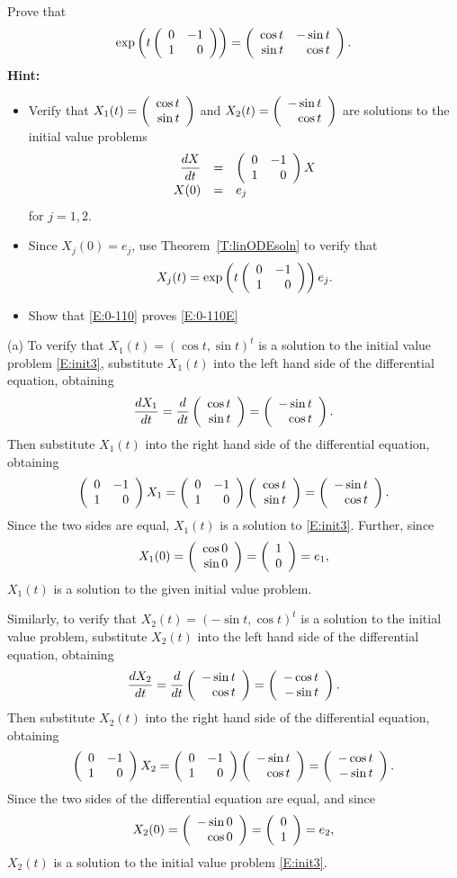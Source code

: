 \documentclass{ximera}
\begin{document}
\begin{computerExercise}  \label{c6.2.5C}
Prove that
\begin{equation}  \label{E:0-110E}
\exp\left(t\left(\begin{array}{rr} 0 & -1\\ 1 &0\end{array}\right)\right) =
\left(\begin{array}{rr} \cos t & -\sin t\\ \sin t &\cos t\end{array}\right).
\end{equation}
{\bf Hint:}
\begin{itemize}
\item[(a)] Verify that $X_1(t) = \left(\begin{array}{r} \cos t \\ \sin t\end{array}\right)$ and
$X_2(t) = \left(\begin{array}{r} -\sin t \\ \cos t\end{array}\right)$ are solutions to the initial value problems
\begin{equation}  \label{E:init3}
\begin{array}{rcl}
\displaystyle\frac{dX}{dt} & = & \left(\begin{array}{rr} 0 & -1\\ 1 &0\end{array}\right)X \\
X(0) & = & e_j
\end{array}
\end{equation}
for $j=1,2$.
\item[(b)] Since $X_j(0)=e_j$, use Theorem~\ref{T:linODEsoln} to verify that
\begin{equation}   \label{E:0-110}
X_j(t) = \exp\left(t\left(\begin{array}{rr} 0 & -1\\ 1 &0\end{array}\right)\right)e_j.
\end{equation}
\item[(c)]  Show that \eqref{E:0-110} proves \eqref{E:0-110E}
\end{itemize}

\begin{solution}

(a) To verify that $X_1(t) = (\cos t,\sin t)^t$ is a solution to the
initial value problem \eqref{E:init3}, substitute $X_1(t)$ into the left
hand side of the differential equation, obtaining
\[
\frac{dX_1}{dt} = \frac{d}{dt}\left(\begin{array}{r} \cos t \\ \sin t\end{array}\right) =
\left(\begin{array}{r} -\sin t \\ \cos t\end{array}\right).
\]
Then substitute $X_1(t)$ into the right hand side of the differential
equation, obtaining
\[
\left(\begin{array}{rr} 0 & -1\\ 1 &0\end{array}\right)X_1 = \left(\begin{array}{rr} 0 & -1\\ 1 &0\end{array}\right)\left(\begin{array}{r} \cos t \\ \sin t\end{array}\right)
= \left(\begin{array}{r} -\sin t \\ \cos t\end{array}\right).
\]
Since the two sides are equal, $X_1(t)$ is a solution to
\eqref{E:init3}.  Further, since
\[
X_1(0) = \left(\begin{array}{r} \cos 0 \\ \sin 0\end{array}\right) = \left(\begin{array}{r} 1 \\ 0\end{array}\right) = e_1,
\]
$X_1(t)$ is a solution to the given initial value problem.

\para Similarly, to verify that $X_2(t) = (-\sin t,\cos t)^t$ is a
solution to the initial value problem, substitute $X_2(t)$ into the
left hand side of the differential equation, obtaining
\[
\frac{dX_2}{dt} = \frac{d}{dt}\left(\begin{array}{r} -\sin t \\ \cos t\end{array}\right) =
\left(\begin{array}{r} -\cos t \\ -\sin t\end{array}\right).
\]
Then substitute $X_2(t)$ into the right hand side of the differential
equation, obtaining
\[
\left(\begin{array}{rr} 0 & -1\\ 1 &0\end{array}\right)X_2 = \left(\begin{array}{rr} 0 & -1\\ 1 &0\end{array}\right)\left(\begin{array}{r} -\sin t \\ \cos t\end{array}\right)
= \left(\begin{array}{r} -\cos t \\ -\sin t\end{array}\right).
\]
Since the two sides of the differential equation are equal, and since
\[
X_2(0) = \left(\begin{array}{r} -\sin 0 \\ \cos 0\end{array}\right) = \left(\begin{array}{r} 0 \\ 1\end{array}\right) = e_2,
\]
$X_2(t)$ is a solution to the initial value problem \eqref{E:init3}.


\end{solution}
\end{computerExercise}
\end{document}
